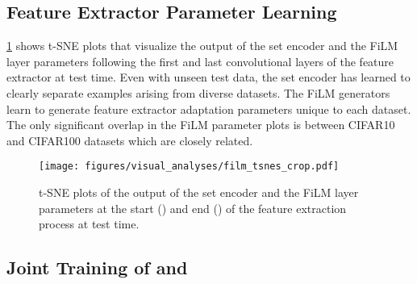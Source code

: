 \documentclass{article}
\theoremstyle{definition}
\begin{document}
\subsection{Feature Extractor Parameter Learning}
\label{app:film_visualization}

\cref{fig:adaptation_tsne} shows t-SNE \citep{maaten2008visualizing} plots that visualize the output of the set encoder  and the FiLM layer parameters following the first and last convolutional layers of the feature extractor at test time. Even with unseen test data, the set encoder has learned to clearly separate examples arising from diverse datasets. The FiLM generators learn to generate feature extractor adaptation parameters unique to each dataset. The only significant overlap in the FiLM parameter plots is between CIFAR10 and CIFAR100 datasets which are closely related.

\begin{figure}[ht]

\centering
\texttt{[image: figures/visual\_analyses/film\_tsnes\_crop.pdf]} \hfill
\caption{t-SNE plots of the output of the set encoder  and the FiLM layer parameters at the start () and end () of the feature extraction process at test time.}
\label{fig:adaptation_tsne}

\end{figure}

\subsection{Joint Training of \texorpdfstring{}{TEXT} and \textbf{\texorpdfstring{}{TEXT}} }
\label{app:training_experiments}
\end{document}
